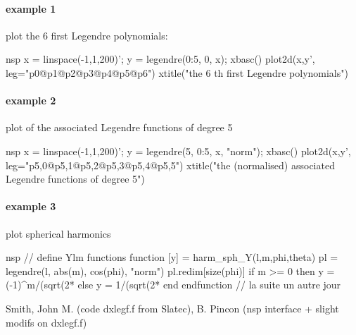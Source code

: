 \begin{examples}
\paragraph{example 1} plot the 6 first Legendre polynomials:
\begin{mintednsp}{nsp}
x = linspace(-1,1,200)';
y = legendre(0:5, 0, x);
xbasc()
plot2d(x,y', leg="p0@p1@p2@p3@p4@p5@p6")
xtitle("the 6 th first Legendre polynomials")
\end{mintednsp}

\paragraph{example 2} plot of the associated Legendre functions of degree 5 
\begin{mintednsp}{nsp}
x = linspace(-1,1,200)';
y = legendre(5, 0:5, x, "norm");
xbasc()
plot2d(x,y', leg="p5,0@p5,1@p5,2@p5,3@p5,4@p5,5")
xtitle("the (normalised) associated Legendre functions of degree 5")
\end{mintednsp}

\paragraph{example 3} plot spherical harmonics
\begin{mintednsp}{nsp}
// define Ylm functions
function [y] = harm_sph_Y(l,m,phi,theta)
   pl = legendre(l, abs(m), cos(phi), "norm")
   pl.redim[size(phi)]
   if m >= 0 then
      y = (-1)^m/(sqrt(2*%
   else
      y = 1/(sqrt(2*%
   end      
endfunction
// la suite un autre jour
\end{mintednsp}

\end{examples}

\begin{authors}
Smith, John M. (code dxlegf.f from Slatec), B. Pincon (nsp interface + slight modifs on dxlegf.f) 
\end{authors}

